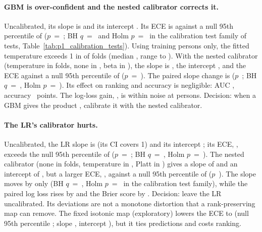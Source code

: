 \paragraph{GBM is over-confident and the nested calibrator corrects it.} Uncalibrated, its slope is
 and its intercept . Its ECE is  against a null 95th
percentile of  ($p$~=~; BH $q$~=~ and
Holm $p$~=~ in the calibration test family of 
tests, Table~\ref{tab:p1_calibration_tests}). Using training persons only, the fitted temperature exceeds 1
in  of  folds (median , range
 to ). With the nested calibrator (temperature in
 folds, none in , beta in
), the slope is , the intercept
, and the ECE  against a null 95th percentile of
 ($p$~=~). The paired slope change is
 ($p$~; BH $q$~=~, Holm
$p$~=~). Its effect on ranking and accuracy is negligible: AUC
, accuracy ~points. The log-loss gain,
, is within noise at  persons. Decision: when a GBM gives the product
\pright{}, calibrate it with the nested calibrator.

\paragraph{The LR's calibrator hurts.} Uncalibrated, the LR slope is  (its CI covers 1)
and its intercept ; its ECE, , exceeds the null 95th percentile of
 ($p$~=~; BH $q$~=~, Holm
$p$~=~). The nested calibrator (none in  folds,
temperature in , Platt in ) gives a slope
of  and an intercept of , but a larger ECE, ,
against a null 95th percentile of  ($p$~). The slope moves by only
 (BH $q$~=~, Holm
$p$~=~ in the calibration test family), while the paired log loss rises
by  and the Brier score by . Decision: leave
the LR uncalibrated. Its deviations are not a monotone distortion that a rank-preserving map can remove.
The fixed isotonic map (exploratory) lowers the ECE to  (null 95th percentile
; slope , intercept
), but it ties predictions and costs ranking.


